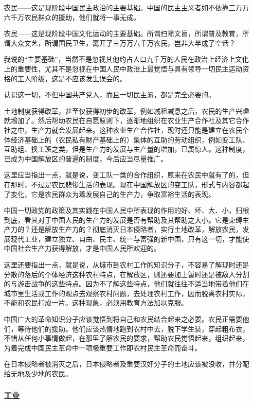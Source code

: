 农民——这是现阶段中国民主政治的主要基础。中国的民主主义者如不依靠三万万六千万农民群众的援助，他们就将一事无成。

农民——这是现阶段中国文化运动的主要基础。所谓扫除文盲，所谓普及教育，所谓大众文艺，所谓国民卫生，离开了三万万六千万农民，岂非大半成了空话？

我说的“主要基础”，当然不是忽视其他约占人口九千万的人民在政治上经济上文化上的重要性，尤其不是忽视在中国人民中政治上最觉悟与具有领导一切民主运动资格的工人阶级，这是不应该发生误会的。

认识这一切，不但中国共产党人，而且一切民主派，都是完全必要的。

土地制度获得改革，甚至仅获得初步的改革，例如减租减息之后，农民的生产兴趣就增加了。然后帮助农民在自愿原则下，逐渐地组织在农业生产合作社及其它合作社之中，生产力就会发展起来。这种农业生产合作社，现时还只能是建立在农民个体经济基础上的（农民私有财产基础上的）集体的互助的劳动组织，例如变工队、互助组、换工班之类，但是生产力的发展与生产量的增加，已属惊人。这种制度，已成为中国解放区的普遍的制度，今后应当尽量推广。

这里应当指出一点，就是说，变工队一类的合作组织，原来在农民中就有了的，但在那时，不过是农民悲惨生活的表现。现在中国解放区的变工队，形式与内容都起了变化，它是农民群众为着发展自己的生产力，争取富裕生活的表现。

中国一切政党的政策及其实践在中国人民中所表现的作用的好、坏、大、小，归根到底，看其对于中国人民的生产力的发展是否有帮助及其帮助之大小。它是束缚生产力的？还是解放生产力的？彻底消灭日本侵略者，实行土地改革，解放农民，发展现代工业，建立独立、自由、民主、统一与富强的新中国，只有这一切，才能使中国社会生产力获得解放，才是中国人民所欢迎的。

这里还要指出一点，就是说，从城市到农村工作的知识分子，不容易了解现时还是分散的落后的个体经济这种农村特点，在解放区，则还要加上暂时还是被敌人分割的与游击战争的这些特点。因为不了解这些特点，他们就往往不适当地带着他们在城市里生活或工作的观点去观察农村问题，去处理农村工作，因而脱离农村实际，不能和农民打成一片。这种现象，必须用教育方法加以克服。

中国广大的革命知识分子应该觉悟到将自己和农民结合起来之必要。农民正需要他们，等待他们的援助。他们应该热情地跑到农村中去，脱下学生装，穿起粗布衣，不惜从任何小事情做起，在那里了解农民的要求，帮助农民觉悟起来，组织起来，为着完成中国民主革命中一项极重要工作即农村民主革命而奋斗。

在日本侵略者被消灭之后，日本侵略者及重要汉奸分子的土地应该被没收，并分配给无地及少地的农民。

\subsubsection{工业}

